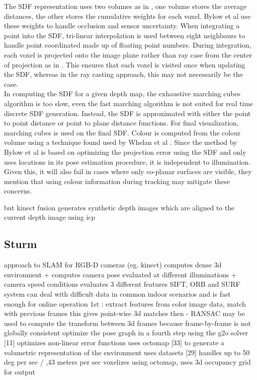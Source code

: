 The SDF representation uses two volumes as in \cite{Curless96Volumetric}, one volume stores the average distances, the other stores the cumulative weights for each voxel. Bylow et al use these weights to handle occlusion and sensor uncertainty. When integrating a point into the SDF, tri-linear interpolation is used between eight neighbours to handle point coordinated made up of floating point numbers. During integration, each voxel is projected onto the image plane rather than ray case from the center of projection as in \cite{Newcombe11Kinectfusion}. This ensures that each voxel is visited once when updating the SDF, whereas in the ray casting approach, this may not necessarily be the case. \\

In computing the SDF for a given depth map, the exhaustive marching cubes algorithm is too slow, even the fast marching algorithm \cite{Baerentzen01Implementation} is not suited for real time discrete SDF generation. Instead, the SDF is approximated with either the point to point distance or point to plane distance functions. For final visualization, marching cubes is used \cite{Lorensen87Marching} on the final SDF. Colour is computed from the colour volume using a technique found used by Whelan et al \cite{Whelan13Robust}. Since the method by Bylow et al is based on optimizing the projection error using the SDF and only uses locations in its pose estimation procedure, it is independent to illumination. Given this, it will also fail in cases where only co-planar surfaces are visible, they mention that using colour information during tracking \cite{Kerl13Robust} may mitigate these concerns.


but kinect fusion generates synthetic depth images which are aligned to the current depth image using icp


\subsection{Sturm}

approach to SLAM for RGB-D cameras (eg. kinect)
computes dense 3d environment + computes camera pose
evaluated at different illuminations + camera speed conditions
evaluates 3 different features SIFT, ORB and SURF
system can deal with difficult data in common indoor scenarios and is fast enough for online operation
1st : extract features from color image data, match with previous frames
this gives point-wise 3d matches
then - RANSAC may be used to compute the transform between 3d frames
because frame-by-frame is not globally consistent
optimize the pose graph in a fourth step using the g2o solver [11] optimizes non-linear error functions
uses octomap [33] to generate a volumetric representation of the environment
uses datasets [29]
handles up to 50 deg per sec / ,43 meters per sec
voxelizes using octomap, uses 3d occupancy grid for output

